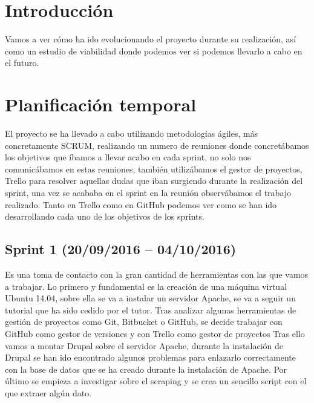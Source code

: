 
\section{Introducción}

Vamos a ver cómo ha ido evolucionando el proyecto durante su realización, así como un estudio de viabilidad donde podemos ver si podemos llevarlo a cabo en el futuro.

\section{Planificación temporal}
El proyecto se ha llevado a cabo utilizando metodologías ágiles, más concretamente SCRUM, realizando un numero de reuniones donde concretábamos los objetivos que íbamos a llevar acabo en cada sprint, no solo nos comunicábamos en estas reuniones, también utilizábamos el gestor de proyectos, Trello para resolver aquellas dudas que iban surgiendo durante la realización del sprint, una vez se acababa en el sprint en la reunión observábamos el trabajo realizado. Tanto en Trello como en GitHub podemos ver como se han ido desarrollando cada uno de los objetivos de los sprints.

\subsection{Sprint 1 (20/09/2016 – 04/10/2016)}
Es una toma de contacto con la gran cantidad de herramientas con las que vamos a trabajar. Lo primero y fundamental es la creación de una máquina virtual Ubuntu 14.04, sobre ella se va a instalar un servidor Apache, se va a seguir un tutorial que ha sido cedido por el tutor.
Tras analizar algunas herramientas de gestión de proyectos como Git, Bitbucket o GitHub, se decide trabajar con GitHub como gestor de versiones y con Trello como gestor de proyectos
Tras ello vamos a montar Drupal sobre el servidor Apache, durante la instalación de Drupal se han ido encontrado algunos problemas para enlazarlo correctamente con la base de datos que se ha creado durante la instalación de Apache.
Por último se empieza a investigar sobre el scraping y se crea un sencillo script con el que extraer algún dato.

